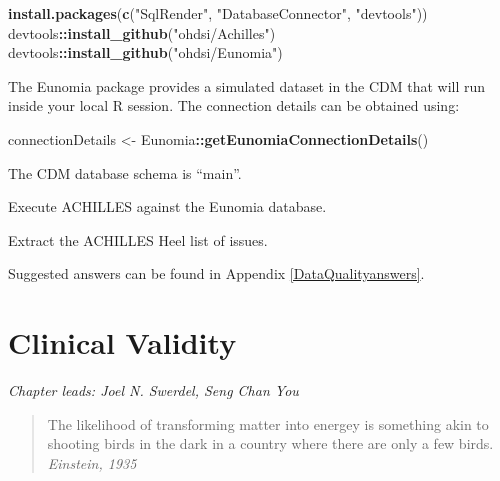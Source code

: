 \documentclass[11pt]{book}
\newenvironment{Shaded}{\begin{snugshade}}{\end{snugshade}}
\newcommand{\KeywordTok}[1]{\textcolor[rgb]{0.13,0.29,0.53}{\textbf{#1}}}
\newcommand{\NormalTok}[1]{#1}
\newcommand{\OperatorTok}[1]{\textcolor[rgb]{0.81,0.36,0.00}{\textbf{#1}}}
\newcommand{\StringTok}[1]{\textcolor[rgb]{0.31,0.60,0.02}{#1}}
\theoremstyle{definition}
\theoremstyle{definition}
\theoremstyle{definition}
\theoremstyle{remark}
\let\BeginKnitrBlock\begin \let\EndKnitrBlock\end
\begin{document}
\begin{Shaded}
\begin{Highlighting}[]
\KeywordTok{install.packages}\NormalTok{(}\KeywordTok{c}\NormalTok{(}\StringTok{"SqlRender"}\NormalTok{, }\StringTok{"DatabaseConnector"}\NormalTok{, }\StringTok{"devtools"}\NormalTok{))}
\NormalTok{devtools}\OperatorTok{::}\KeywordTok{install_github}\NormalTok{(}\StringTok{"ohdsi/Achilles"}\NormalTok{)}
\NormalTok{devtools}\OperatorTok{::}\KeywordTok{install_github}\NormalTok{(}\StringTok{"ohdsi/Eunomia"}\NormalTok{)}
\end{Highlighting}
\end{Shaded}

The Eunomia package provides a simulated dataset in the CDM that will run inside your local R session. The connection details can be obtained using:

\begin{Shaded}
\begin{Highlighting}[]
\NormalTok{connectionDetails <-}\StringTok{ }\NormalTok{Eunomia}\OperatorTok{::}\KeywordTok{getEunomiaConnectionDetails}\NormalTok{()}
\end{Highlighting}
\end{Shaded}

The CDM database schema is ``main''.

\BeginKnitrBlock{exercise}
\protect\hypertarget{exr:exerciseRunAchilles}{}{\label{exr:exerciseRunAchilles} }Execute ACHILLES against the Eunomia database.
\EndKnitrBlock{exercise}

\BeginKnitrBlock{exercise}
\protect\hypertarget{exr:exerciseViewHeel}{}{\label{exr:exerciseViewHeel} }Extract the ACHILLES Heel list of issues.
\EndKnitrBlock{exercise}

Suggested answers can be found in Appendix \ref{DataQualityanswers}.

\hypertarget{ClinicalValidity}{%
\chapter{Clinical Validity}\label{ClinicalValidity}}

\emph{Chapter leads: Joel N. Swerdel, Seng Chan You}

\begin{quote}
The likelihood of transforming matter into energey is something akin to shooting birds in the dark in a country where there are only a few birds. \emph{Einstein, 1935}
\end{quote}
\end{document}

